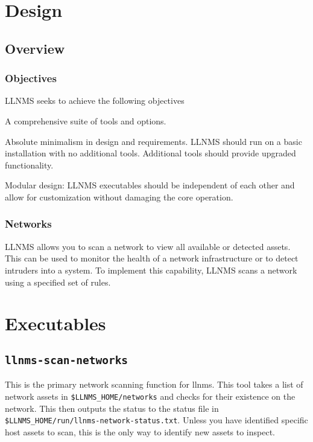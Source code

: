\documentclass[12pt]{report}
\begin{document}
\section*{Design}

\subsection*{Overview}

\subsubsection*{Objectives}
LLNMS seeks to achieve the following objectives
\begin{declarative}
\item A comprehensive suite of tools and options.
\item Absolute minimalism in design and requirements.  LLNMS should run on a basic installation with no additional tools.  Additional tools should provide upgraded functionality.
\item [Modular design: ] LLNMS executables should be independent of each other and allow for customization without damaging the core operation. 
\end{declarative}

\subsubsection*{Networks}

LLNMS allows you to scan a network to view all available or detected assets.  This 
can be used to monitor the health of a network infrastructure or to detect intruders into
a system.  To implement this capability, LLNMS scans a network using a specified set of 
rules.  

\section*{Executables}
\subsection*{\texttt{llnms-scan-networks}}
This is the primary network scanning function for llnms.  This tool takes a list of network assets
in \texttt{\$LLNMS\_HOME/networks} and checks for their existence on the network.  This then outputs the 
status to the status file in \texttt{\$LLNMS\_HOME/run/llnms-network-status.txt}. Unless you have identified
specific host assets to scan, this is the only way to identify new assets to inspect. 
\end{document}
